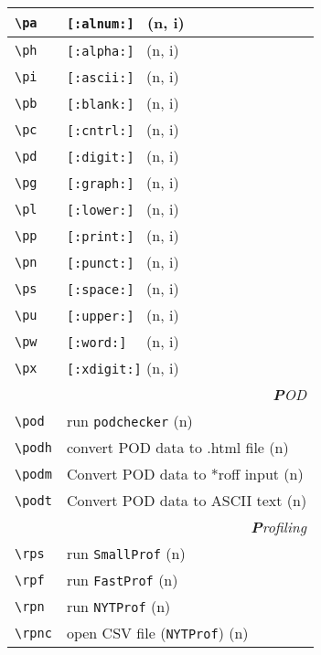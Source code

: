 \documentclass[oneside,10pt,landscape,DIV17]{scrartcl}
\begin{document}
\begin{multicols}{3}
\begin{center}
\begin{tabular}[]{|p{11mm}|p{58mm}|}
\hline \verb'\pa' &  \verb'[:alnum:] '         \hfill (n, i)   \\
\hline \verb'\ph' &  \verb'[:alpha:] '         \hfill (n, i)   \\
\hline \verb'\pi' &  \verb'[:ascii:] '         \hfill (n, i)   \\
\hline \verb'\pb' &  \verb'[:blank:] '         \hfill (n, i)   \\
\hline \verb'\pc' &  \verb'[:cntrl:] '         \hfill (n, i)   \\
\hline \verb'\pd' &  \verb'[:digit:] '         \hfill (n, i)   \\
\hline \verb'\pg' &  \verb'[:graph:] '         \hfill (n, i)   \\
\hline \verb'\pl' &  \verb'[:lower:] '         \hfill (n, i)   \\
\hline \verb'\pp' &  \verb'[:print:] '         \hfill (n, i)   \\
\hline \verb'\pn' &  \verb'[:punct:] '         \hfill (n, i)   \\
\hline \verb'\ps' &  \verb'[:space:] '         \hfill (n, i)   \\
\hline \verb'\pu' &  \verb'[:upper:] '         \hfill (n, i)   \\
\hline \verb'\pw' &  \verb'[:word:]  '         \hfill (n, i)   \\
\hline \verb'\px' &  \verb'[:xdigit:]'         \hfill (n, i)   \\
\hline
\hline
\multicolumn{2}{|r|}{\textsl{\textbf{P}OD}} \\[1.0ex]
\hline \verb'\pod'    & run \verb'podchecker'           \hfill (n)   \\
\hline \verb'\podh'   & convert POD data to .html file  \hfill (n)   \\
\hline \verb'\podm'   & Convert POD data to *roff input \hfill (n)   \\
\hline \verb'\podt'   & Convert POD data to ASCII text  \hfill (n)   \\
\hline
\hline
\multicolumn{2}{|r|}{\textsl{\textbf{P}rofiling}} \\[1.0ex]
\hline \verb'\rps'    & run \verb'SmallProf' \hfill (n)   \\
\hline \verb'\rpf'    & run \verb'FastProf'  \hfill (n)   \\
\hline \verb'\rpn'    & run \verb'NYTProf'   \hfill (n)   \\
\hline \verb'\rpnc'   & open CSV file (\verb'NYTProf')   \hfill (n)   \\
\hline
\end{tabular}%
%
\end{center}%
\end{multicols}%
\end{document}
